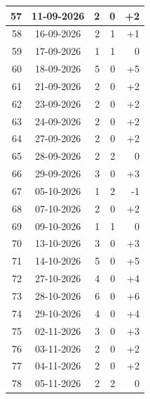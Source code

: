 \begin{longtable}{|r|c|r|r|r|}
57 & 11-09-2026 & 2 & 0 & +2 \\ \hline
58 & 16-09-2026 & 2 & 1 & +1 \\ \hline
59 & 17-09-2026 & 1 & 1 & 0 \\ \hline
60 & 18-09-2026 & 5 & 0 & +5 \\ \hline
61 & 21-09-2026 & 2 & 0 & +2 \\ \hline
62 & 23-09-2026 & 2 & 0 & +2 \\ \hline
63 & 24-09-2026 & 2 & 0 & +2 \\ \hline
64 & 27-09-2026 & 2 & 0 & +2 \\ \hline
65 & 28-09-2026 & 2 & 2 & 0 \\ \hline
66 & 29-09-2026 & 3 & 0 & +3 \\ \hline
67 & 05-10-2026 & 1 & 2 & -1 \\ \hline
68 & 07-10-2026 & 2 & 0 & +2 \\ \hline
69 & 09-10-2026 & 1 & 1 & 0 \\ \hline
70 & 13-10-2026 & 3 & 0 & +3 \\ \hline
71 & 14-10-2026 & 5 & 0 & +5 \\ \hline
72 & 27-10-2026 & 4 & 0 & +4 \\ \hline
73 & 28-10-2026 & 6 & 0 & +6 \\ \hline
74 & 29-10-2026 & 4 & 0 & +4 \\ \hline
75 & 02-11-2026 & 3 & 0 & +3 \\ \hline
76 & 03-11-2026 & 2 & 0 & +2 \\ \hline
77 & 04-11-2026 & 2 & 0 & +2 \\ \hline
78 & 05-11-2026 & 2 & 2 & 0 \\ \hline
\end{longtable}

\normalsize


